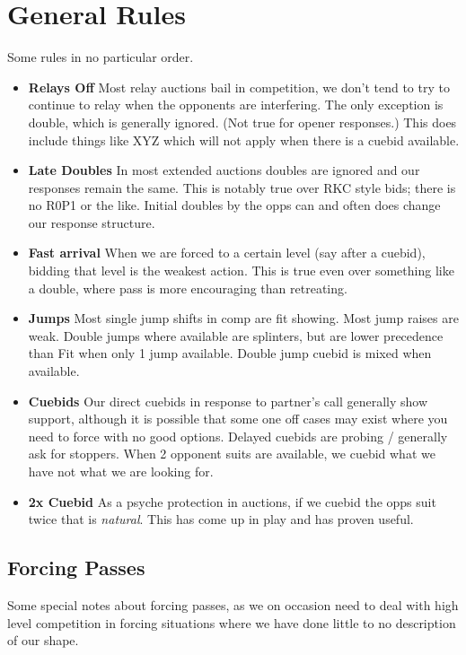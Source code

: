 \documentclass[main]{subfile}
\begin{document}
	
\chapter{General Rules}

Some rules in no particular order.

\begin{itemize}[]
\item \textbf{Relays Off} Most relay auctions bail in competition, we don't tend to try to continue to relay when the opponents are interfering. The only exception is double, which is generally ignored. (Not true for  opener responses.)  This does include things like XYZ which will not apply when there is a cuebid available.
\item \textbf{Late Doubles} In most extended auctions doubles are ignored and our responses remain the same. This is notably true over RKC style bids; there is no R0P1 or the like. Initial doubles by the opps can and often does change our response structure.
\item \textbf{Fast arrival} When we are forced to a certain level (say after a cuebid), bidding that level is the weakest action. This is true even over something like a double, where pass is more encouraging than retreating.
\item \textbf{Jumps} Most single jump shifts in comp are fit showing. Most jump raises are weak. Double jumps where available are splinters, but are lower precedence than Fit when only 1 jump available. Double jump cuebid is mixed when available.
\item \textbf{Cuebids} Our direct cuebids in response to partner's call generally show support, although it is possible that some one off cases may exist where you need to force with no good options.  Delayed cuebids are probing / generally ask for stoppers. When 2 opponent suits are available, we cuebid what we have not what we are looking for.
\item \textbf{2x Cuebid} As a psyche protection in  auctions, if we cuebid the opps suit twice that is \textit{natural}. This has come up in play and has proven useful.
\end{itemize}

\section{Forcing Passes}

Some special notes about forcing passes, as we on occasion need to deal with high level competition in forcing situations where we have done little to no description of our shape.
\end{document}
